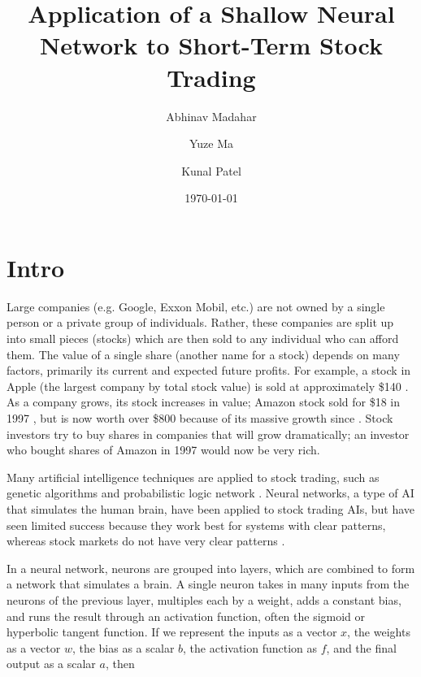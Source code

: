 \documentclass[twocolumn]{article}
\begin{document}
\date{\today}

\title{Application of a Shallow Neural Network to Short-Term Stock Trading}

\author[1]{Abhinav Madahar}
\author[2]{Yuze Ma}
\author[3]{Kunal Patel}

\maketitle

\begin{abstract}
\blindtext[1]
\end{abstract}

\section{Intro}


Large companies (e.g. Google, Exxon Mobil, etc.) are not owned by a single person or a private group of individuals. Rather, these companies are split up into small pieces (stocks) which are then sold to any individual who can afford them. The value of a single share (another name for a stock) depends on many factors, primarily its current and expected future profits. For example, a stock in Apple (the largest company by total stock value) is sold at approximately \$140 \cite{yahooapple}. As a company grows, its stock increases in value; Amazon stock sold for \$18 in 1997 \cite{investopedia}, but is now worth over \$800 because of its massive growth since \cite{yahooamazon}. Stock investors try to buy shares in companies that will grow dramatically; an investor who bought shares of Amazon in 1997 would now be very rich.

Many artificial intelligence techniques are applied to stock trading, such as genetic algorithms and probabilistic logic network \cite{wired}. Neural networks, a type of AI that simulates the human brain, have been applied to stock trading AIs, but have seen limited success because they work best for systems with clear patterns, whereas stock markets do not have very clear patterns \cite{hurwitz}.

In a neural network, neurons are grouped into layers, which are combined to form a network that simulates a brain. A single neuron takes in many inputs from the neurons of the previous layer, multiples each by a weight, adds a constant bias, and runs the result through an activation function, often the sigmoid or hyperbolic tangent function. If we represent the inputs as a vector $x$, the weights as a vector $w$, the bias as a scalar $b$, the activation function as $f$, and the final output as a scalar $a$, then
\end{document}
